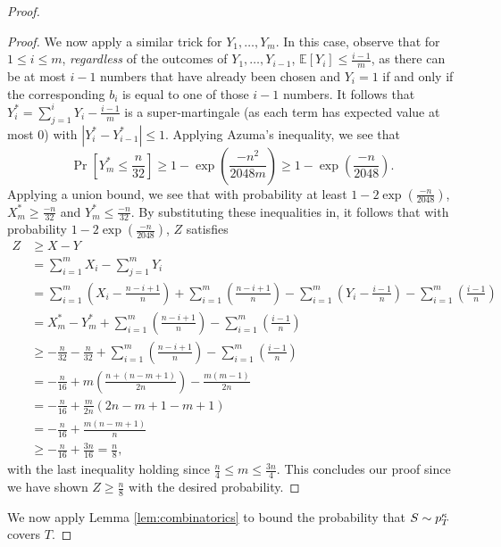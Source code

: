 \begin{proof}
\begin{proof}
We now apply a similar trick for $Y_1, \dots, Y_m$. In this case, observe that for $1 \leq i \leq m$, \textit{regardless} of the outcomes of $Y_1, \dots, Y_{i-1}$, $\mathbb{E}[Y_i] \leq \frac{i-1}{m}$, as there can be at most $i-1$ numbers that have already been chosen and $Y_i = 1$ if and only if the corresponding $b_i$ is equal to one of those $i-1$ numbers. It follows that $Y_i^* = \sum_{j=1}^i Y_i - \frac{i-1}{m}$ is a super-martingale (as each term has expected value at most $0$) with $|Y_i^* - Y_{i-1}^*| \leq 1$. Applying Azuma's inequality, we see that $$\Pr[Y_m^* \leq \frac{n}{32}] \geq 1 - \exp \left( \frac{-n^2}{2048m}\right) \geq 1 - \exp \left(\frac{-n}{2048}\right).$$ Applying a union bound, we see that with probability at least $1 - 2\exp \left(\frac{-n}{2048}\right)$, $X_m^* \geq \frac{-n}{32}$ and $Y_m^* \leq \frac{-n}{32}$. By substituting these inequalities in, it follows that with probability $1 - 2\exp \left(\frac{-n}{2048}\right)$, $Z$ satisfies
\begin{equation*}
\begin{split}
Z &\geq X - Y \\
&= \sum_{i=1}^m X_i - \sum_{j = 1}^m Y_i \\
&= \sum_{i=1}^m \left(X_i - \frac{n - i+1}{n} \right) + \sum_{i=1}^m \left(\frac{n-i+1}{n}\right) - \sum_{i=1}^m \left(Y_i - \frac{i-1}{n} \right) - \sum_{i=1}^m \left(\frac{i-1}{n}\right) \\
&= X_m^* - Y_m^* + \sum_{i=1}^m \left(\frac{n-i+1}{n}\right) -  \sum_{i=1}^m \left(\frac{i-1}{n}\right) \\
&\geq -\frac{n}{32} - \frac{n}{32} + \sum_{i=1}^m \left(\frac{n-i+1}{n}\right) -  \sum_{i=1}^m \left(\frac{i-1}{n}\right) \\
&= -\frac{n}{16} + m\left(\frac{n + (n-m + 1)}{2n}\right) - \frac{m(m-1)}{2n} \\
&= -\frac{n}{16} + \frac{m}{2n}\left(2n - m + 1 - m + 1\right) \\
&= -\frac{n}{16} + \frac{m(n - m + 1)}{n} \\
&\geq -\frac{n}{16} + \frac{3n}{16} = \frac{n}{8},
\end{split}
\end{equation*}
with the last inequality holding since $\frac{n}{4} \leq m \leq \frac{3n}{4}$. This concludes our proof since we have shown $Z \geq \frac{n}{8}$ with the desired probability.

\end{proof}

We now apply Lemma \ref{lem:combinatorics} to bound the probability that $S \sim p_T^\kappa$ covers $T$. 


\end{proof}
